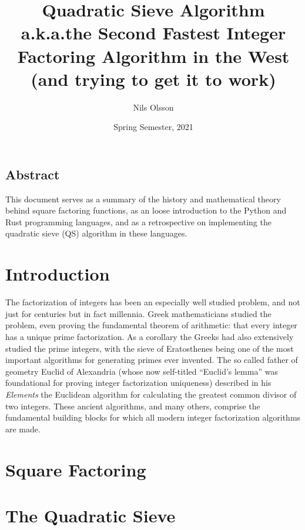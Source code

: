 \documentclass{report}
\begin{document}
\title{%
    Quadratic Sieve Algorithm \\[1em]
    {\large%
        a.k.a.\@ the Second Fastest Integer Factoring Algorithm in the West \\
        (and trying to get it to work)
    }
}
\author{Nils Olsson}
\date{Spring Semester, 2021}
\maketitle

\begingroup
\let\clearpage\relax
\section*{Abstract}

This document serves as a summary of the history and mathematical theory
behind square factoring functions, as an loose introduction to the Python and
Rust programming languages, and as a retrospective on implementing the quadratic
sieve (QS) algorithm in these languages.

\chapter{Introduction}

The factorization of integers has been an especially well studied problem,
and not just for centuries but in fact millennia.
Greek mathematicians studied the problem, even proving the fundamental theorem
of arithmetic: that every integer has a unique prime factorization.
As a corollary the Greeks had also extensively studied the prime integers,
with the sieve of Eratosthenes being one of the most important algorithms
for generating primes ever invented.
The so called father of geometry Euclid of Alexandria (whose now self-titled
``Euclid's lemma'' was foundational for proving integer factorization
uniqueness) described in his \emph{Elements} the Euclidean algorithm for
calculating the greatest common divisor of two integers.
These ancient algorithms, and many others, comprise the fundamental building
blocks for which all modern integer factorization algorithms are made.

\endgroup

\chapter{Square Factoring}

\chapter{The Quadratic Sieve}
\end{document}
